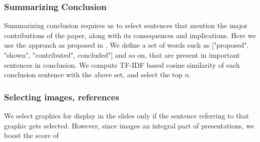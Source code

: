 \subsubsection{Summarizing Conclusion}
Summarizing conclusion requires us to select sentences that mention the
major contributions of the paper, along with its consequences and implications.
Here we use the approach as proposed in \cite{sravanthi}. We define a set of words	
such as ["proposed", "shown", "contributed", concluded"] and so on, that 
are present in important sentences in conclusion. We compute TF-IDF based cosine similarity of
each conclusion sentence with the above set, and select the top  $n$.

\subsubsection{Selecting images, references}
We select graphics for display in the slides only if the sentence referring to that graphic
gets selected. However, since images an integral part of presentations, we boost
the score of 